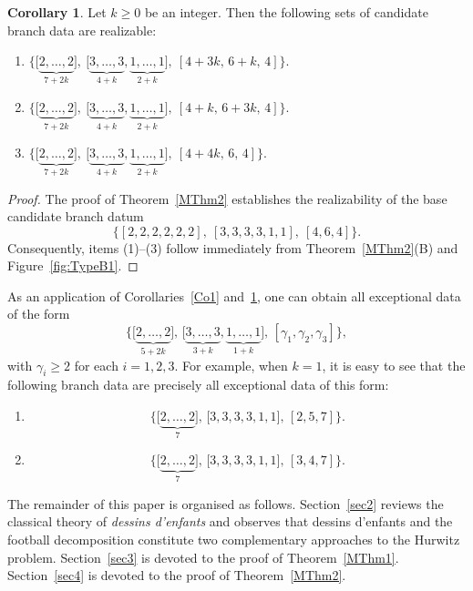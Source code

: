 \documentclass[microtype]{gtpart}     %
\theoremstyle{definition}
\newtheorem{cor}{Corollary}[section]
\begin{document}
\begin{cor}\label{Co2}
Let $k \ge 0$ be an integer. Then the following sets of candidate branch data are realizable:
\begin{enumerate}
\item $\displaystyle
\bigl\{
   \bigl[ \underbrace{2,\ldots,2}_{7+2k} \bigr],\
   \bigl[ \underbrace{3,\ldots,3}_{4+k},\underbrace{1,\ldots,1}_{2+k} \bigr],\
   [4+3k,\,6+k,\,4]
\bigr\}.
$
\item $\displaystyle
\bigl\{
   \bigl[ \underbrace{2,\ldots,2}_{7+2k} \bigr],\
   \bigl[ \underbrace{3,\ldots,3}_{4+k},\underbrace{1,\ldots,1}_{2+k} \bigr],\
   [4+k,\,6+3k,\,4]
\bigr\}.
$

\item $\displaystyle
\bigl\{
   \bigl[ \underbrace{2,\ldots,2}_{7+2k} \bigr],\
   \bigl[ \underbrace{3,\ldots,3}_{4+k},\underbrace{1,\ldots,1}_{2+k} \bigr],\
   [4+4k,\,6,\,4]
\bigr\}.
$
\end{enumerate}
\end{cor}
\begin{proof}
The proof of Theorem~\ref{MThm2} establishes the realizability of the base candidate branch datum
\[
\bigl\{
 [2,2,2,2,2,2],\
  [3,3,3,3,1,1],\
  [4,6,4]
\bigr\}.
\]
Consequently, items (1)--(3) follow immediately from Theorem~\ref{MThm2}(B) and Figure~\ref{fig:TypeB1}.
\end{proof}

As an application of Corollaries~\ref{Co1} and~\ref{Co2}, one can obtain all exceptional data of the form
\[
\bigl\{ \bigl[ \underbrace{2,\ldots,2}_{5+2k} \bigr],\,
\bigl[ \underbrace{3,\ldots,3}_{3+k},\underbrace{1,\ldots,1}_{1+k} \bigr],\,
[\gamma_1,\gamma_2,\gamma_3] \bigr\},
\]
with \(\gamma_i \ge 2\) for each \(i=1,2,3\). For example, when \(k=1\), it is easy to see that the following branch data are precisely all exceptional data of this form:
\begin{enumerate}
\item \[
\bigl\{ \bigl[ \underbrace{2,\ldots,2}_{7} \bigr],\,
\bigl[ 3,3,3,3,1,1 \bigr],\,
[2,5,7] \bigr\}.
\]
\item \[
\bigl\{ \bigl[ \underbrace{2,\ldots,2}_{7} \bigr],\,
\bigl[ 3,3,3,3,1,1 \bigr],\,
[3,4,7] \bigr\}.
\]
\end{enumerate}

The remainder of this paper is organised as follows. Section~\ref{sec2} reviews the classical theory of \emph{dessins d'enfants} and observes that dessins d'enfants and the football decomposition constitute two complementary approaches to the Hurwitz problem. Section~\ref{sec3} is devoted to the proof of Theorem~\ref{MThm1}. Section~\ref{sec4} is devoted to the proof of Theorem~\ref{MThm2}.
\end{document}
